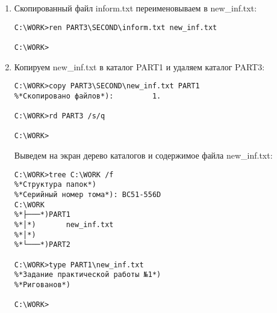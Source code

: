 \documentclass{article}
\begin{document}
\begin{enumerate}
\begin{lstlisting}[language={},numbers={}]
C:\WORK>echo %*Ригованов*) >> PART3\SECOND\inform.txt

C:\WORK>
\end{lstlisting}
\item
Скопированный файл inform.txt переименовываем в new\_inf.txt:
\begin{lstlisting}[language={},numbers={}]
C:\WORK>ren PART3\SECOND\inform.txt new_inf.txt

C:\WORK>
\end{lstlisting}
\newpage
\item
Копируем new\_inf.txt в каталог PART1 и удаляем каталог PART3:
\begin{lstlisting}[language={},numbers={}]
C:\WORK>copy PART3\SECOND\new_inf.txt PART1
%*Скопировано файлов*):         1.

C:\WORK>rd PART3 /s/q

C:\WORK>
\end{lstlisting}

Выведем на экран дерево каталогов и содержимое файла new\_inf.txt:

\begin{lstlisting}[language={},numbers={}]
C:\WORK>tree C:\WORK /f
%*Структура папок*)
%*Серийный номер тома*): BC51-556D
C:\WORK
%*├───*)PART1
%*│*)       new_inf.txt
%*│*)
%*└───*)PART2

C:\WORK>type PART1\new_inf.txt
%*Задание практической работы №1*)
%*Ригованов*)

C:\WORK>
\end{lstlisting}
\end{enumerate}
\end{document}
